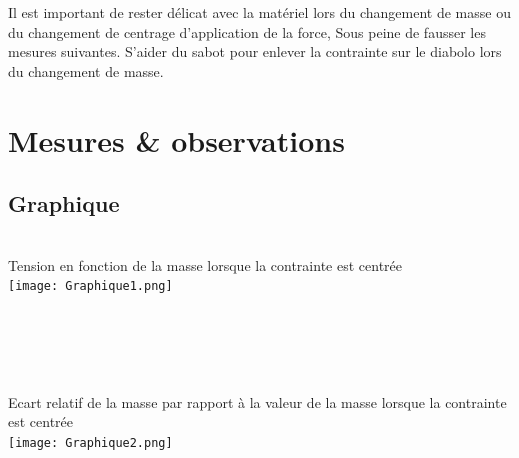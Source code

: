 \documentclass[10pt,a4paper]{report}
\begin{document}
Il est important de rester délicat avec la matériel lors du changement de masse ou du changement de centrage d'application de la force, Sous peine de fausser les mesures suivantes. S'aider du sabot pour enlever la contrainte sur le diabolo lors du changement de masse.
\newpage
\section{Mesures \& observations}
\subsection*{Graphique}
\begin{center}
~\\
Tension en fonction de la masse lorsque la contrainte est centrée~\\
\texttt{[image: Graphique1.png]} ~\\~\\~\\~\\~\\~\\
Ecart relatif de la masse par rapport à la valeur de la masse lorsque la contrainte est centrée~\\
\texttt{[image: Graphique2.png]} ~\\
\end{center}
\newpage
\end{document}
